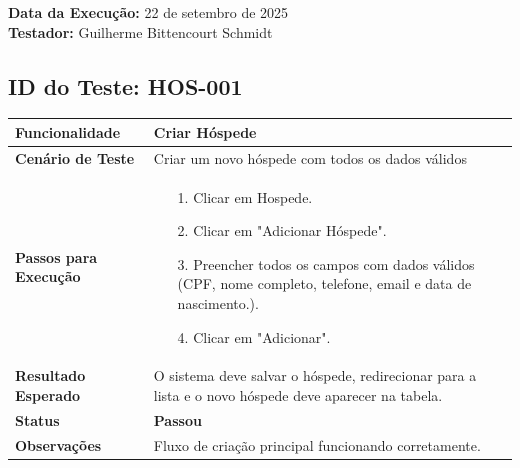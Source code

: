 \documentclass[
	12pt,				%
	openany,			%
	oneside,			%
	a4paper,			%
	english,			%
	french,				%
	spanish,			%
	brazil				%
	]{abntex2}
\begin{document}
\begin{apendicesenv}
	\textbf{Data da Execução:} 22 de setembro de 2025 \\
	\textbf{Testador: } Guilherme Bittencourt Schmidt  
	
	
	\vspace{1cm}
	
	
	\subsection*{ID do Teste: HOS-001}
	\begin{tabular}{@{} p{5cm} p{11cm} @{}}
		\toprule
		\textbf{Funcionalidade} & Criar Hóspede \\
		\midrule
		\textbf{Cenário de Teste} & Criar um novo hóspede com todos os dados válidos \\
		\midrule
		\textbf{Passos para Execução} & 
		\begin{itemize} \itemsep0em 
			\item[1.] Clicar em Hospede.
			\item[2.] Clicar em "Adicionar Hóspede".
			\item[3.] Preencher todos os campos com dados válidos (CPF, nome completo, telefone, email e data de nascimento.).
			\item[4.] Clicar em "Adicionar".
		\end{itemize} \\
		\midrule
		\textbf{Resultado Esperado} & O sistema deve salvar o hóspede, redirecionar para a lista e o novo hóspede deve aparecer na tabela. \\
		\midrule
		\textbf{Status} & \textbf{Passou} \\
		\midrule
		\textbf{Observações} & Fluxo de criação principal funcionando corretamente. \\
		\bottomrule
	\end{tabular}
	\vspace{1cm}
	

\end{apendicesenv}
\end{document}
